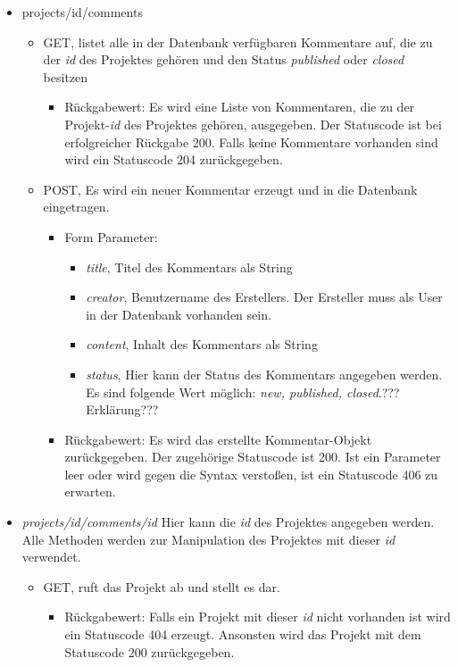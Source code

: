 \documentclass[12pt]{scrartcl}
\begin{document}
\begin{itemize}
	\item projects/id/comments
	\begin{itemize}
		\item GET, listet alle in der Datenbank verfügbaren Kommentare auf, die zu der \emph{id} des Projektes gehören und  den Status \emph{published} oder \emph{closed} besitzen
				\begin{itemize}
					\item Rückgabewert: Es wird eine Liste von Kommentaren, die zu der Projekt-\emph{id} des Projektes gehören, ausgegeben. Der Statuscode ist bei erfolgreicher Rückgabe 200. Falls keine Kommentare vorhanden sind wird ein Statuscode 204 zurückgegeben. 
				\end{itemize}
				\item POST, Es wird ein neuer Kommentar erzeugt und in die Datenbank eingetragen.
				\begin{itemize}
					\item Form Parameter:
					\begin{itemize}
						\item  \emph{title}, Titel des Kommentars als String
						\item  \emph{creator}, Benutzername des Erstellers. Der Ersteller muss als User in der Datenbank vorhanden sein.
						\item  \emph{content}, Inhalt des Kommentars als String
						\item  \emph{status}, Hier kann der Status des Kommentars angegeben werden. Es sind folgende Wert möglich: \emph{new, published, closed}.???Erklärung???
					\end{itemize}
					\item Rückgabewert: Es wird das erstellte Kommentar-Objekt zurückgegeben. Der zugehörige Statuscode ist 200. Ist ein Parameter leer oder wird gegen die Syntax verstoßen, ist ein Statuscode 406 zu erwarten.  
				\end{itemize}
			\end{itemize}
			\item \emph{projects/id/comments/id} Hier kann die \emph{id} des Projektes angegeben werden. Alle Methoden werden zur Manipulation des Projektes mit dieser \emph{id} verwendet.
			\begin{itemize}
				\item GET, ruft das Projekt ab und stellt es dar. 
				\begin{itemize}
					\item Rückgabewert: Falls ein Projekt mit dieser \emph{id} nicht vorhanden ist wird ein Statuscode 404 erzeugt. Ansonsten wird das Projekt mit dem Statuscode 200 zurückgegeben.

\end{itemize}
\end{itemize}
\end{itemize}
\end{document}
